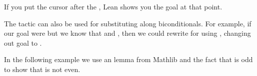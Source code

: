 \documentclass[letterpaper,10pt,english]{sphinxmanual}
\begin{document}
\begin{sphinxVerbatim}[commandchars=\\\{\}]
             
     
     
      \PYG{o}{[} \PYG{o}{]}
\end{sphinxVerbatim}

\sphinxAtStartPar
If you put the cursor after the , Lean shows you the goal at that point.

\sphinxAtStartPar
The tactic  can also be used for substituting along biconditionals.
For example, if our goal were  but we know that  and
, then we could rewrite  for  using ,
changing out goal to .

\begin{sphinxVerbatim}[commandchars=\\\{\}]
                
   \PYG{o}{[}\PYG{o}{]}
   
\end{sphinxVerbatim}

\sphinxAtStartPar
In the following example we use an  lemma from Mathlib
and the fact that  is odd to show that  is not even.

\begin{sphinxVerbatim}[commandchars=\\\{\}]
 
 

 
 

      
   \PYG{o}{[} \PYG{o}{]}
   
\end{sphinxVerbatim}
\end{document}
